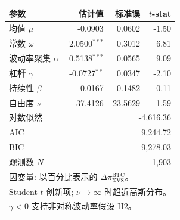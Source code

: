 \begin{tabular}{lrrr}
\toprule
参数 & 估计值 & 标准误 & $t$-stat \\
\midrule
均值 $\mu$ & -0.0903 & 0.0602 & -1.50 \\
常数 $\omega$ & 2.0500$^{***}$ & 0.3012 & 6.81 \\
波动率聚集 $\alpha$ & 0.5138$^{***}$ & 0.0565 & 9.09 \\
\textbf{杠杆 $\gamma$} & -0.0727$^{**}$ & 0.0347 & -2.10 \\
持续性 $\beta$ & -0.0167 & 0.1482 & -0.11 \\
自由度 $\nu$ & 37.4126 & 23.5629 & 1.59 \\
\midrule
对数似然 & \multicolumn{3}{r}{-4,616.36} \\
AIC & \multicolumn{3}{r}{9,244.72} \\
BIC & \multicolumn{3}{r}{9,278.03} \\
观测数 $N$ & \multicolumn{3}{r}{1,903} \\
\bottomrule
\multicolumn{4}{l}{\footnotesize 因变量: 以百分比表示的 $\Delta\pi^{\text{BTC}}_{\text{XVS}}$。}\\
\multicolumn{4}{l}{\footnotesize Student-$t$ 创新项; $\nu \to \infty$ 时趋近高斯分布。}\\
\multicolumn{4}{l}{\footnotesize $\gamma<0$ 支持非对称波动率假设 H2。}\\
\end{tabular}